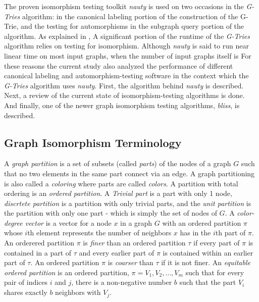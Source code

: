 The proven isomorphism testing toolkit \emph{nauty} is used on two occasions in the \emph{G-Tries} algorithm: in the canonical labeling portion of the construction of the G-Trie, and the testing for automorphisms in the subgraph query portion of the algorithm. As explained in \cite{li12}, A significant portion of the runtime of the \emph{G-Tries} algorithm relies on testing for isomorphism. Although \emph{nauty} is said to run near linear time  on most input graphs, when the number of input graphs itself is 
For these reasons the current study also analyzed the performance of different canonical labeling and automorphism-testing software in the context which the \emph{G-Tries} algorithm uses \emph{nauty}. First, the algorithm behind \emph{nauty} is described. Next, a review of the current state of isomorphism-testing algorithms is done. And finally, one of the newer graph isomorphism testing algorithms, \emph{bliss}, is described. 
\subsection{Graph Isomorphism Terminology}
A \textit{graph partition} is a set of subsets (called \textit{parts}) of the nodes of a graph $G$ such that no two elements in the same part connect via an edge. A graph partitioning is also called a \textit{coloring} where parts are called \textit{colors}. A partition with total ordering is an \textit{ordered partition}. A \textit{Trivial part} is a part with only 1 node, \textit{discrtete partition} is a partition with only trivial parts, and the \textit{unit partition} is the partition with only one part - which is simply the set of nodes of $G$. A \textit{color-degree vector}\cite{marchetti11} is a vector for a node $x$ in a graph $G$ with an ordered partition $\pi$ whose $i$th element represents the number of neighbors $x$ has in the $i$th part of $\pi$. An orderered partition $\pi$ is \textit{finer} than an ordered partition $\tau$ if every part of $\pi$ is contained in a part of $\tau$ and every earlier part of $\pi$ is contained within an earlier part of $\tau$. An ordered partition $\pi$ is \textit{coarser} than $\tau$ if it is not finer. An \textit{equitable ordered partition} is an ordered partition, $\pi = {V_1, V_2, \dots, V_m}$ such that for every pair of indices $i$ and $j$, there is a non-negative number $b$ such that the part $V_{i}$ shares exactly $b$ neighbors with $V_{j}$.

